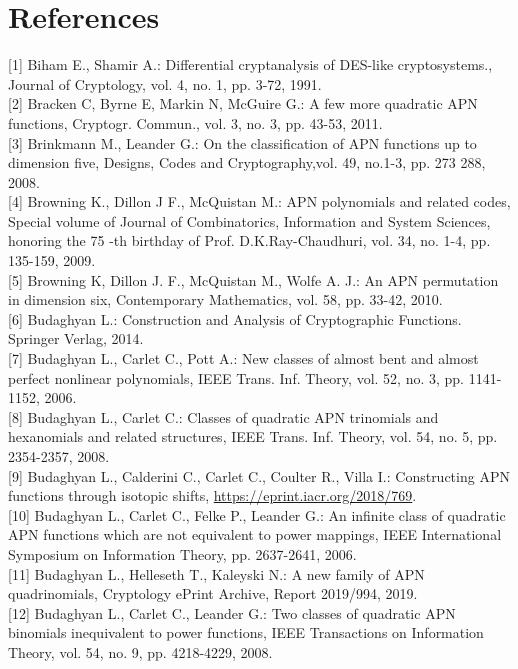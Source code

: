 \documentclass[10pt]{article}
\begin{document}
\section*{References}
[1] Biham E., Shamir A.: Differential cryptanalysis of DES-like cryptosystems., Journal of Cryptology, vol. 4, no. 1, pp. 3-72, 1991.\\[0pt]
[2] Bracken C, Byrne E, Markin N, McGuire G.: A few more quadratic APN functions, Cryptogr. Commun., vol. 3, no. 3, pp. 43-53, 2011.\\[0pt]
[3] Brinkmann M., Leander G.: On the classification of APN functions up to dimension five, Designs, Codes and Cryptography,vol. 49, no.1-3, pp. 273 288, 2008.\\[0pt]
[4] Browning K., Dillon J F., McQuistan M.: APN polynomials and related codes, Special volume of Journal of Combinatorics, Information and System Sciences, honoring the 75 -th birthday of Prof. D.K.Ray-Chaudhuri, vol. 34, no. 1-4, pp. 135-159, 2009.\\[0pt]
[5] Browning K, Dillon J. F., McQuistan M., Wolfe A. J.: An APN permutation in dimension six, Contemporary Mathematics, vol. 58, pp. 33-42, 2010.\\[0pt]
[6] Budaghyan L.: Construction and Analysis of Cryptographic Functions. Springer Verlag, 2014.\\[0pt]
[7] Budaghyan L., Carlet C., Pott A.: New classes of almost bent and almost perfect nonlinear polynomials, IEEE Trans. Inf. Theory, vol. 52, no. 3, pp. 1141-1152, 2006.\\[0pt]
[8] Budaghyan L., Carlet C.: Classes of quadratic APN trinomials and hexanomials and related structures, IEEE Trans. Inf. Theory, vol. 54, no. 5, pp. 2354-2357, 2008.\\[0pt]
[9] Budaghyan L., Calderini C., Carlet C., Coulter R., Villa I.: Constructing APN functions through isotopic shifts, \href{https://eprint.iacr.org/2018/769}{https://eprint.iacr.org/2018/769}.\\[0pt]
[10] Budaghyan L., Carlet C., Felke P., Leander G.: An infinite class of quadratic APN functions which are not equivalent to power mappings, IEEE International Symposium on Information Theory, pp. 2637-2641, 2006.\\[0pt]
[11] Budaghyan L., Helleseth T., Kaleyski N.: A new family of APN quadrinomials, Cryptology ePrint Archive, Report 2019/994, 2019.\\[0pt]
[12] Budaghyan L., Carlet C., Leander G.: Two classes of quadratic APN binomials inequivalent to power functions, IEEE Transactions on Information Theory, vol. 54, no. 9, pp. 4218-4229, 2008.\\[0pt]
\end{document}
